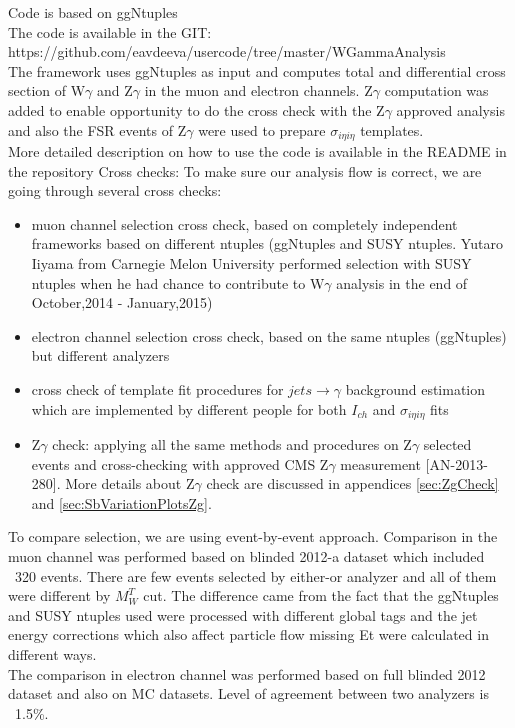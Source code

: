 Code is based on ggNtuples\\
The code is available in the GIT: https://github.com/eavdeeva/usercode/tree/master/WGammaAnalysis\\
The framework uses ggNtuples as input and computes total and differential cross section of W$\gamma$ and Z$\gamma$ in the muon and electron channels. Z$\gamma$ computation was added to enable opportunity to do the cross check with the Z$\gamma$ approved analysis and also the FSR events of Z$\gamma$ were used to prepare $\sigma_{i \eta i \eta}$ templates. \\
More detailed description on how to use the code is available in the README in the repository 
Cross checks:
To make sure our analysis flow is correct, we are going through several cross checks:
\begin{itemize}
\item muon channel selection cross check, based on completely independent frameworks based on different ntuples (ggNtuples and
SUSY ntuples. Yutaro Iiyama from Carnegie Melon University performed selection with SUSY ntuples when he had chance to contribute to W$\gamma$ analysis in the end of October,2014 - January,2015)
\item electron channel selection cross check, based on the same ntuples (ggNtuples) but different analyzers
\item cross check of template fit procedures for $jets \rightarrow \gamma$ background estimation which are implemented by different people for both $I_{ch}$ and $\sigma_{i \eta i \eta}$ fits
\item Z$\gamma$ check: applying all the same methods and procedures on
Z$\gamma$ selected events and cross-checking with approved CMS Z$\gamma$ measurement [AN-2013-280]. More details about Z$\gamma$ check are discussed in appendices \ref{sec:ZgCheck} and \ref{sec:SbVariationPlotsZg}. 
\end{itemize}
To compare selection, we are using event-by-event approach. Comparison in the muon channel was performed based on blinded 2012-a dataset which included ~320 events. There are few events selected by either-or analyzer and all of them were different by $M_W^T$ cut. The difference came from the fact that the ggNtuples and SUSY ntuples used were processed with different global tags and the jet energy corrections which also affect particle flow missing Et were calculated in different ways.\\
The comparison in electron channel was performed based on full blinded 2012 dataset and also on MC datasets. Level of agreement between two analyzers is ~1.5\%.\\



